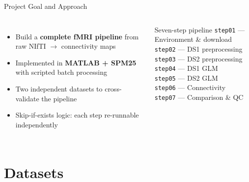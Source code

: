 \documentclass[aspectratio=169]{beamer}
\begin{document}
\begin{frame}{Project Goal and Approach}
  \begin{columns}
      \begin{itemize}
        \item Build a \textbf{complete fMRI pipeline} from raw NIfTI $\to$ connectivity maps
        \item Implemented in \textbf{MATLAB + SPM25} with scripted batch processing
        \item Two independent datasets to cross-validate the pipeline
        \item Skip-if-exists logic: each step re-runnable independently
      \end{itemize}
      \begin{block}{Seven-step pipeline}
        \texttt{step01} --- Environment \& download\\
        \texttt{step02} --- DS1 preprocessing\\
        \texttt{step03} --- DS2 preprocessing\\
        \texttt{step04} --- DS1 GLM\\
        \texttt{step05} --- DS2 GLM\\
        \texttt{step06} --- Connectivity\\
        \texttt{step07} --- Comparison \& QC
      \end{block}
  \end{columns}
\end{frame}

\section{Datasets}
\end{document}
